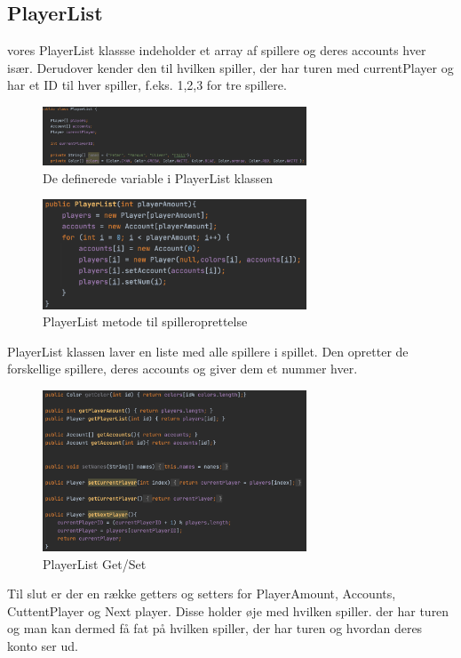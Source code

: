 \subsection{PlayerList}

vores PlayerList klassse indeholder et array af spillere og deres accounts hver især. Derudover kender den til hvilken spiller, der har turen med currentPlayer og har et ID til hver spiller, f.eks. 1,2,3 for tre spillere.
\begin{figure}[H]
    \centering
    \includegraphics[width=0.7\textwidth]{sources/7_implementering/PlayerListClass.png}
    \caption{De definerede variable i PlayerList klassen}
    \label{fig:playerListklasse}
\end{figure}



\begin{figure}[H]
    \centering
    \includegraphics[width=0.7\textwidth]{sources/7_implementering/PlayerListList.png}
    \caption{PlayerList metode til spilleroprettelse}
    \label{fig:playerListmetode}
\end{figure}
PlayerList klassen laver en liste med alle spillere i spillet.  Den opretter de forskellige spillere, deres accounts og giver dem et nummer hver.


\begin{figure}[H]
    \centering
    \includegraphics[width=0.7\textwidth]{sources/7_implementering/PlayerListGetSet.png}
    \caption{PlayerList Get/Set}
    \label{fig:plistGetSet}
\end{figure}
Til slut er der en række getters og setters for PlayerAmount, Accounts, CuttentPlayer og Next player. Disse holder øje med hvilken spiller. der har turen og man kan dermed få fat på hvilken spiller, der har turen og hvordan deres konto ser ud.
